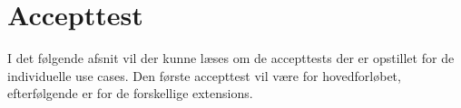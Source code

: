 \chapter{Accepttest}
I det følgende afsnit vil der kunne læses om de accepttests der er opstillet for de individuelle use cases. Den første accepttest vil være for hovedforløbet, efterfølgende er for de forskellige extensions.


\newpage

\newpage
%

\newpage

\newpage

\newpage

\newpage

\newpage
